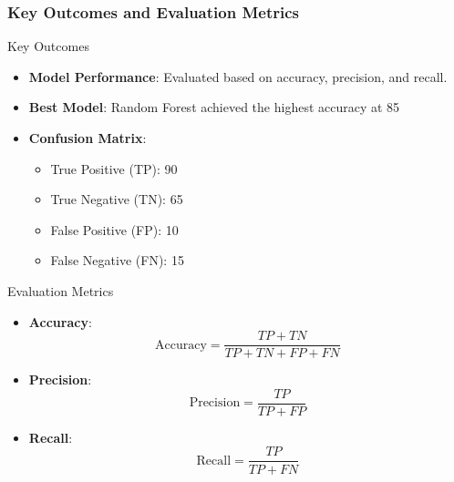 \documentclass[aspectratio=169]{beamer}
\begin{document}
\begin{frame}[fragile]
    \frametitle{Key Outcomes and Evaluation Metrics}
    \begin{block}{Key Outcomes}
        \begin{itemize}
            \item \textbf{Model Performance}: Evaluated based on accuracy, precision, and recall.
            \item \textbf{Best Model}: Random Forest achieved the highest accuracy at 85%
            \item \textbf{Confusion Matrix}:
            \begin{itemize}
                \item True Positive (TP): 90
                \item True Negative (TN): 65
                \item False Positive (FP): 10
                \item False Negative (FN): 15
            \end{itemize}
        \end{itemize}
    \end{block}
    
    \begin{block}{Evaluation Metrics}
        \begin{itemize}
            \item \textbf{Accuracy}:
            \begin{equation}
            \text{Accuracy} = \frac{TP + TN}{TP + TN + FP + FN}
            \end{equation}
            \item \textbf{Precision}:
            \begin{equation}
            \text{Precision} = \frac{TP}{TP + FP}
            \end{equation}
            \item \textbf{Recall}:
            \begin{equation}
            \text{Recall} = \frac{TP}{TP + FN}
            \end{equation}
        \end{itemize}
    \end{block}
\end{frame}
\end{document}
